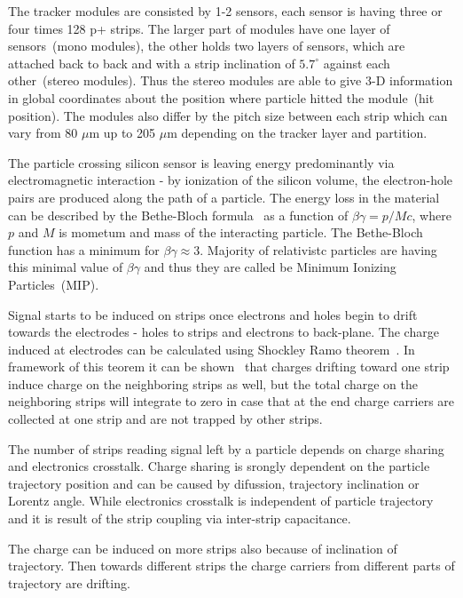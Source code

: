 The tracker modules are consisted by 1-2 sensors, each sensor is having three or four times 128 p+ strips. The larger part of modules have one layer of sensors~(mono modules), the other holds two layers of sensors, which are attached back to back and with a strip inclination of $5.7^{\circ}$ against each other~(stereo modules). Thus the stereo modules are able to give 3-D information in global coordinates about the position where particle hitted the module~(hit position). The modules also differ by the pitch size between each strip which can vary from 80 $\mu$m up to 205 $\mu$m depending on the tracker layer and partition.

The particle crossing silicon sensor is leaving energy predominantly via electromagnetic interaction - by ionization of the silicon volume, the electron-hole pairs are produced along the path of a particle. The energy loss in the material can be described by the Bethe-Bloch formula~\cite{Groom:2000sm} as a function of $\beta\gamma = p/Mc$, where $p$ and $M$ is mometum and mass of the interacting particle. The Bethe-Bloch function has a minimum for $\beta\gamma \approx 3$. Majority of relativistc particles are having this minimal value of $\beta\gamma$ and thus they are called be Minimum Ionizing Particles~(MIP).


Signal starts to be induced on strips once electrons and holes begin to drift towards the electrodes - holes to strips and electrons to back-plane. The charge induced at electrodes can be calculated using Shockley Ramo theorem~\cite{doi:10.1063/1.1710367,Ramo:1939vr}. In framework of this teorem it can be shown~\cite{Bloch:2007zza} that charges drifting toward one strip induce charge on the neighboring strips as well, but the total charge on the neighboring strips will integrate to zero in case that at the end charge carriers are collected at one strip and are not trapped by other strips.

The number of strips reading signal left by a particle depends on charge sharing and electronics crosstalk. Charge sharing is srongly dependent on the particle trajectory position and can be caused by difussion, trajectory inclination or Lorentz angle. While electronics crosstalk is independent of particle trajectory and it is result of the strip coupling via inter-strip capacitance. 

The charge can be induced on more strips also because of inclination of trajectory. Then towards different strips the charge carriers from different parts of trajectory are drifting.

